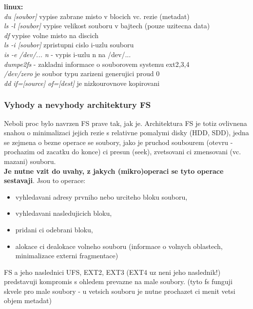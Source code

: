 \documentclass[a4paper, 11pt]{article}
\begin{document}
\textbf{linux:} \\[0.5em]
\textit{du [soubor]} vypise zabrane misto v blocich vc. rezie (metadat) \\[0.2em]
\textit{ls -l [soubor]} vypise velikost souboru v bajtech (pouze uzitecna data) \\[0.2em]
\textit{df} vypise volne misto na discich \\[0.2em]
\textit{ls -i [soubor]} zpristupni cislo i-uzlu souboru \\[0.2em]
\textit{is -e /dev/... n} - vypis i-uzlu n na /dev/... \\[0.2em]
\textit{dumpe2fs} - zakladni informace o souborovem systemu ext2,3,4 \\[0.2em]
\textit{/dev/zero} je soubor typu zarizeni generujici proud 0 \\[0.2em]
\textit{dd if=[source] of=[dest]} je nizkourovnove kopirovani \\

\newpage

\subsubsection{Vyhody a nevyhody architektury FS}
Neboli proc bylo navrzen FS prave tak, jak je. Architektura FS je totiz ovlivnena snahou o minimalizaci jejich rezie s relativne pomalymi disky (HDD, SDD), jedna se zejmena o bezne operace se soubory, jako je pruchod soubourem (otevru - prochazim od zacatku do konce) ci presun (seek), zvetsovani ci zmensovani (vc. mazani) souboru. \\

\textbf{Je nutne vzit do uvahy, z jakych (mikro)operaci se tyto operace sestavaji}. Jsou to operace:
\begin{itemize}
    \item vyhledavani adresy prvniho nebo urciteho bloku souboru,
    \item vyhledavani nasledujicich bloku,
    \item pridani ci odebrani bloku,
    \item alokace ci dealokace volneho souboru (informace o volnych oblastech, minimalizace externi fragmentace) \\
\end{itemize}

FS a jeho naslednici UFS, EXT2, EXT3 (EXT4 uz neni jeho naslednik!) predstavuji kompromis s ohledem prevazne na male soubory. (tyto fs funguji skvele pro male soubory - u vetsich souboru je nutne prochazet ci menit vetsi objem metadat) \\
\end{document}
